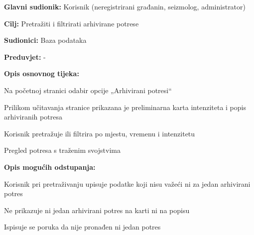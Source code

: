 				\noindent {}
				\begin{packed_item}
					
					\item \textbf{Glavni sudionik:} Korisnik (neregistrirani građanin, seizmolog, administrator)
					\item \textbf{Cilj:} Pretražiti i filtrirati arhivirane potrese
					\item \textbf{Sudionici:} Baza podataka
					\item \textbf{Preduvjet:} -
					
					\item \textbf{Opis osnovnog tijeka:}
					
					\item[] \begin{packed_enum}
						\item Na početnoj stranici odabir opcije „Arhivirani potresi“
						\item Prilikom učitavanja stranice prikazana je preliminarna karta intenziteta i popis arhiviranih potresa
						\item Korisnik pretražuje ili filtrira po mjestu, vremenu i intenzitetu
						\item Pregled potresa s traženim svojstvima
					\end{packed_enum}
					
					\item  \textbf{Opis mogućih odstupanja:}
					
					\item[] \begin{packed_item}
						
						\item[3.a] Korisnik pri pretraživanju upisuje podatke koji nisu važeći ni za jedan arhivirani potres
						\item[] \begin{packed_enum}
							
							\item Ne prikazuje ni jedan arhivirani potres na karti ni na popisu
							\item Ispisuje se poruka da nije pronađen ni jedan potres
							
						\end{packed_enum}
						
					\end{packed_item}
					
				\end{packed_item}
